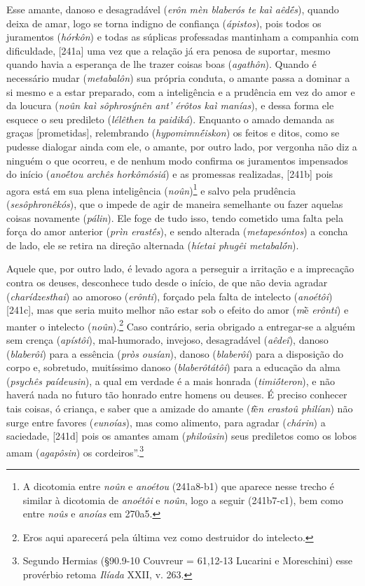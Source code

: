 Esse amante, danoso e desagradável (\emph{erôn mèn blaberós te kaì
aêdḗs}), quando deixa de amar, logo se torna indigno de confiança
(\emph{ápistos}), pois todos os juramentos (\emph{hórkôn}) e todas as
súplicas professadas mantinham a companhia com dificuldade, {[}241a{]}
uma vez que a relação já era penosa de suportar, mesmo quando havia a
esperança de lhe trazer coisas boas (\emph{agathôn}). Quando é
necessário mudar (\emph{metabalôn}) sua própria conduta, o amante passa
a dominar a si mesmo e a estar preparado, com a inteligência e a
prudência em vez do amor e da loucura (\emph{noûn kaì sôphrosýnên ant'
érôtos kaì manías}), e dessa forma ele esquece o seu predileto
(\emph{lélêthen ta paidiká}). Enquanto o amado demanda as graças
{[}prometidas{]}, relembrando (\emph{hypomimnḗiskon}) os feitos e ditos,
como se pudesse dialogar ainda com ele, o amante, por outro lado, por
vergonha não diz a ninguém o que ocorreu, e de nenhum modo confirma os
juramentos impensados do início (\emph{anoḗtou archês horkômósiá}) e as
promessas realizadas, {[}241b{]} pois agora está em sua plena
inteligência (\emph{noûn})\footnote{A dicotomia entre \emph{noûn} e
  \emph{anoétou} (241a8-b1) que aparece nesse trecho é similar à
  dicotomia de \emph{anoétôi} e \emph{noûn}, logo a seguir (241b7-c1),
  bem como entre \emph{noûs} e \emph{anoías} em 270a5.} e salvo pela
prudência (\emph{sesôphronêkós}), que o impede de agir de maneira
semelhante ou fazer aquelas coisas novamente (\emph{pálin}). Ele foge de
tudo isso, tendo cometido uma falta pela força do amor anterior
(\emph{prìn erastḗs}), e sendo alterada (\emph{metapesóntos}) a concha
de lado, ele se retira na direção alternada (\emph{híetai phugêi
metabalṓn}).

Aquele que, por outro lado, é levado agora a perseguir a irritação e a
imprecação contra os deuses, desconhece tudo desde o início, de que não
devia agradar (\emph{charídzesthai}) ao amoroso (\emph{erônti}), forçado
pela falta de intelecto (\emph{anoétôi}) {[}241c{]}, mas que seria muito
melhor não estar sob o efeito do amor (\emph{m}ḕ \emph{erônti}) e manter
o intelecto (\emph{noûn}).\footnote{Eros aqui aparecerá pela última vez
  como destruidor do intelecto.} Caso contrário, seria obrigado a
entregar-se a alguém sem crença (\emph{apístôi}), mal-humorado,
invejoso, desagradável (\emph{aêdeî}), danoso (\emph{blaberôi}) para a
essência (\emph{pròs ousían}), danoso (\emph{blaberôi}) para a
disposição do corpo e, sobretudo, muitíssimo danoso
(\emph{blaberôtátôi}) para a educação da alma (\emph{psychês
paídeusin}), a qual em verdade é a mais honrada (\emph{timiṓteron}), e
não haverá nada no futuro tão honrado entre homens ou deuses. É preciso
conhecer tais coisas, ó criança, e saber que a amizade do amante
(\emph{t}ḕ\emph{n erastoû philían}) não surge entre favores
(\emph{eunoías}), mas como alimento, para agradar (\emph{chárin}) a
saciedade, {[}241d{]} pois os amantes amam (\emph{philoûsin}) seus
prediletos como os lobos amam (\emph{agapôsin}) os
cordeiros''.\footnote{Segundo Hermias (§90.9-10 Couvreur = 61,12-13
  Lucarini e Moreschini) esse provérbio retoma \emph{Ilíada} XXII, v.
  263.}

